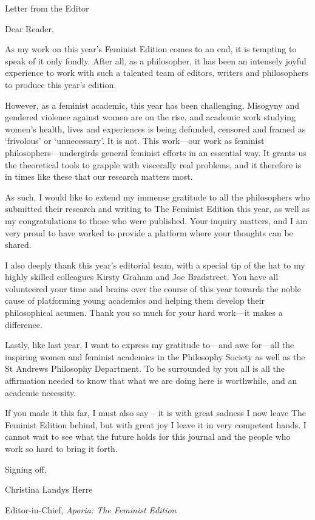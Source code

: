 \vspace*{\credgap}
{\noindent\LARGE\sc Letter from the Editor}
\vspace{\credgap}

\vspace{\ackgap}\noindent
Dear Reader,

\vspace{\credgap}\noindent
As my work on this year’s Feminist Edition comes to an end, it is
tempting to speak of it only fondly. After all, as a philosopher, it
has been an intensely joyful experience to work with such a talented
team of editors, writers and philosophers to produce this year’s
edition.

However, as a feminist academic, this year has been challenging.
Misogyny and gendered violence against women are on the rise, and
academic work studying women’s health, lives and experiences is being
defunded, censored and framed as ‘frivolous’ or ‘unnecessary’. It is
not. This work---our work as feminist philosophers---undergirds
general feminist efforts in an essential way. It grants us the
theoretical tools to grapple with viscerally real problems, and it
therefore is in times like these that our research matters most.

As such, I would like to extend my immense gratitude to all the
philosophers who submitted their research and writing to The Feminist
Edition this year, as well as my congratulations to those who were
published. Your inquiry matters, and I am very proud to have worked to
provide a platform where your thoughts can be shared.

I also deeply thank this year’s editorial team, with a special tip of
the hat to my highly skilled colleagues Kirsty Graham and Joe
Bradstreet. You have all volunteered your time and brains over the
course of this year towards the noble cause of platforming young
academics and helping them develop their philosophical acumen. Thank
you so much for your hard work---it makes a difference.

Lastly, like last year, I want to express my gratitude to---and awe
for---all the inspiring women and feminist academics in the Philosophy
Society as well as the St Andrews Philosophy Department. To be
surrounded by you all is all the affirmation needed to know that what
we are doing here is worthwhile, and an academic necessity.

If you made it this far, I must also say – it is with great sadness I
now leave The Feminist Edition behind, but with great joy I leave it
in very competent hands. I cannot wait to see what the future holds
for this journal and the people who work so hard to bring it forth.

\vspace{\credgap}\noindent
Signing off,

\vspace{\ackgap}\noindent
Christina Landys Herre

\noindent
Editor-in-Chief, \emph{Aporia: The Feminist Edition}
